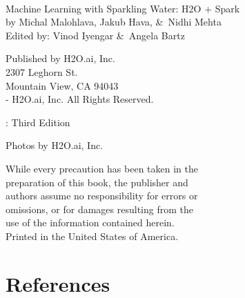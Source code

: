     {\raggedright\vfill\

    Machine Learning with Sparkling Water: H2O + Spark\\
    by Michal Malohlava, Jakub Hava, \&\ Nidhi Mehta\\
    Edited by: Vinod Iyengar \&\ Angela Bartz

    \bigskip
    Published by H2O.ai, Inc. \\
    2307 Leghorn St. \\
    Mountain View, CA 94043\\
    \bigskip
    -\the\year \hspace{1pt} H2O.ai, Inc. All Rights Reserved.
    \bigskip

    \monthname \hspace{1pt}  \the\year: Third Edition
    \bigskip

    Photos by \textcopyright H2O.ai, Inc.
    \bigskip

    While every precaution has been taken in the\\
    preparation of this book, the publisher and\\
    authors assume no responsibility for errors or\\
    omissions, or for damages resulting from the\\
    use of the information contained herein.\\
    \bigskip
    Printed in the United States of America.


    }\par

    \newpage
    \tableofcontents

    \newpage
    

    \newpage
    

    \newpage
    

    \newpage
    

    \newpage
    

    \newpage
    

    \newpage
    

    \newpage
    

    \newpage
    

    \newpage
    

    \newpage


    \section{References}

    


